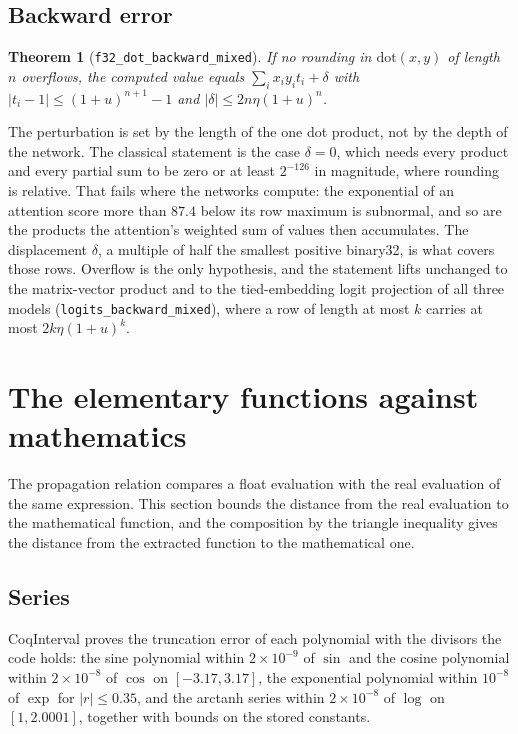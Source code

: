 \documentclass[11pt]{article}
\theoremstyle{plain}
\newtheorem{theorem}{Theorem}[section]
\theoremstyle{definition}
\newcommand{\code}[1]{\texttt{#1}}
\begin{document}
\subsection{Backward error}

\begin{theorem}[\code{f32\_dot\_backward\_mixed}]
If no rounding in $\mathrm{dot}(x, y)$ of length $n$ overflows, the computed
value equals $\sum_i x_i y_i t_i + \delta$ with
$|t_i - 1| \le (1+u)^{n+1} - 1$ and
$|\delta| \le 2 n \eta (1+u)^{n}$.
\end{theorem}

The perturbation is set by the length of the one dot product, not by the depth
of the network. The classical statement \cite{higham2002} is the case
$\delta = 0$, which needs every product and every partial sum to be zero or at
least $2^{-126}$ in magnitude, where rounding is relative. That fails where the
networks compute: the exponential of an attention score more than $87.4$ below
its row maximum is subnormal, and so are the products the attention's weighted
sum of values then accumulates. The displacement $\delta$, a multiple of half the smallest
positive binary32, is what covers those rows. Overflow is the only hypothesis,
and the statement lifts unchanged to the matrix-vector product and to the
tied-embedding logit projection of all three models
(\code{logits\_backward\_mixed}), where a row of length at most $k$ carries at
most $2 k \eta (1+u)^{k}$.

\section{The elementary functions against mathematics}
\label{sec:elem}

The propagation relation compares a float evaluation with the real evaluation
of the same expression. This section bounds the distance from the real
evaluation to the mathematical function, and the composition by the triangle
inequality gives the distance from the extracted function to the mathematical
one.

\subsection{Series}

CoqInterval \cite{coqinterval} proves the truncation error of each polynomial
with the divisors the code holds: the sine polynomial within $2\times10^{-9}$ of
$\sin$ and the cosine polynomial within $2\times10^{-8}$ of $\cos$ on
$[-3.17, 3.17]$, the exponential polynomial within $10^{-8}$ of $\exp$ for
$|r| \le 0.35$, and the arctanh series within $2\times10^{-8}$ of $\log$ on
$[1, 2.0001]$, together with bounds on the stored constants.
\end{document}
